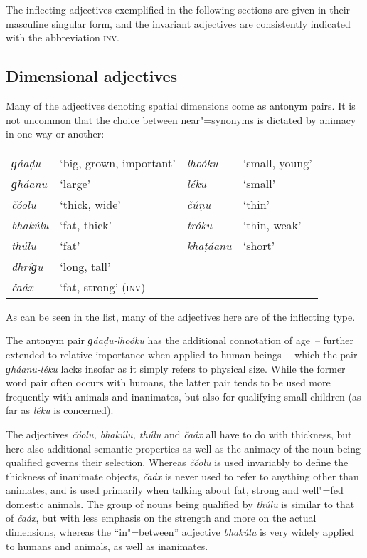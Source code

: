 The inflecting adjectives exemplified in the following sections are given in their masculine singular form, and the invariant adjectives are consistently indicated with the abbreviation \textsc{inv}.


\subsection{Dimensional adjectives}
\label{subsec:6-2-1}

Many of the adjectives denoting spatial dimensions come as antonym pairs. It is not uncommon that the choice between near"=synonyms is dictated by animacy in one way or another:



\begin{table}[H]
\begin{tabularx}{\textwidth}{ l Q l Q }
\textit{ɡáaḍu} &
`big, grown, important' &
\textit{lhoóku} &
`small, young'\\
\textit{ɡháanu} &
`large' &
\textit{léku} &
`small'\\
\textit{čóolu} &
`thick, wide' &
\textit{čúṇu} &
`thin'\\
\textit{bhakúlu} &
`fat, thick' &
\textit{tróku} &
`thin, weak'\\
\textit{thúlu} &
`fat' &
\textit{khaṭáanu} &
`short'\\
\textit{dhríɡu} &
`long, tall' &
&
\\
\textit{čaáx} &
`fat, strong' (\textsc{inv)} &
&
\\
\end{tabularx}
\end{table}


As can be seen in the list, many of the adjectives here are of the inflecting type.


The antonym pair \textit{ɡáaḍu-lhoóku} has the additional connotation of age~-- further extended to relative importance when applied to human beings~-- which the pair \textit{ɡháanu-léku} lacks insofar as it simply refers to physical size. While the former word pair often occurs with humans, the latter pair tends to be used more frequently with animals and inanimates, but also for qualifying small children (as far as \textit{léku} is concerned).



The adjectives \textit{čóolu, bhakúlu, thúlu} and \textit{čaáx} all have to do with thickness, but here also additional semantic properties as well as the animacy of the noun being qualified governs their selection. Whereas \textit{čóolu} is used invariably to define the thickness of inanimate objects, \textit{čaáx} is never used to refer to anything other than animates, and is used primarily when talking about fat, strong and well"=fed domestic animals. The group of nouns being qualified by \textit{thúlu} is similar to that of \textit{čaáx}, but with less emphasis on the strength and more on the actual dimensions, whereas the ``in"=between'' adjective \textit{bhakúlu} is very widely applied to humans and animals, as well as inanimates. 



